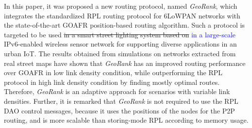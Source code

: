 \documentclass[final,authoryear,3p,twocolumn]{elsarticle}
\newcommand{\removed}{\sout}
\newcommand{\rev}{\textcolor{blue}}
\begin{document}
In this paper, it was proposed a new routing protocol, named \textit{GeoRank}, which integrates the standardized RPL routing protocol for 6LoWPAN networks with the state-of-the-art GOAFR position-based routing algorithm. 
Such a protocol is targeted to be used \removed{in a smart street lighting system based on} \rev{in a large-scale} IPv6-enabled wireless sensor network for supporting diverse applications in an urban IoT. The results obtained from simulations on networks extracted from real street maps have shown that \textit{GeoRank} has an improved routing performance over GOAFR in low link density condition, while outperforming the RPL protocol in high link density condition by finding mostly optimal routes. Therefore, \textit{GeoRank} is an adaptive approach for scenarios with variable link densities. Further, it is remarked that \textit{GeoRank} is not required to use the RPL DAO control messages, because it uses the positions of the nodes for the P2P routing, and is more scalable than storing-mode RPL according to memory usage. 
	
%



\end{document}
